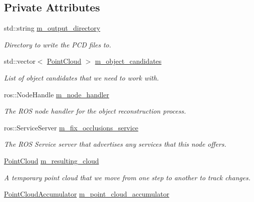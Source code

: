 \subsection*{\-Private \-Attributes}
\begin{DoxyCompactItemize}
\item 
std\-::string \hyperlink{classobject__reconstruction__node_a4177671d10573e28564ba3945bb05cb5}{m\-\_\-output\-\_\-directory}
\begin{DoxyCompactList}\small\item\em \-Directory to write the \-P\-C\-D files to. \end{DoxyCompactList}\item 
std\-::vector$<$ \hyperlink{_helper_functions_8h_abb956d1047f4dd2c956fe3cb0dd0004d}{\-Point\-Cloud} $>$ \hyperlink{classobject__reconstruction__node_a1c2d6c9c999230706a087a87aca78cce}{m\-\_\-object\-\_\-candidates}
\begin{DoxyCompactList}\small\item\em \-List of object candidates that we need to work with. \end{DoxyCompactList}\item 
ros\-::\-Node\-Handle \hyperlink{classobject__reconstruction__node_ac4c5d38f03eefaea752963d27555c222}{m\-\_\-node\-\_\-handler}
\begin{DoxyCompactList}\small\item\em \-The \-R\-O\-S node handler for the object reconstruction process. \end{DoxyCompactList}\item 
ros\-::\-Service\-Server \hyperlink{classobject__reconstruction__node_a0beb4c4e79ee822d4ca5bb320eb8ddfd}{m\-\_\-fix\-\_\-occlusions\-\_\-service}
\begin{DoxyCompactList}\small\item\em \-The \-R\-O\-S \-Service server that advertises any services that this node offers. \end{DoxyCompactList}\item 
\hyperlink{_helper_functions_8h_abb956d1047f4dd2c956fe3cb0dd0004d}{\-Point\-Cloud} \hyperlink{classobject__reconstruction__node_ab8f97cd647f37bc708c8d7542150c17c}{m\-\_\-resulting\-\_\-cloud}
\begin{DoxyCompactList}\small\item\em \-A temporary point cloud that we move from one step to another to track changes. \end{DoxyCompactList}\item 
\hyperlink{class_point_cloud_accumulator}{\-Point\-Cloud\-Accumulator} \hyperlink{classobject__reconstruction__node_aa3895b09cfc1f4e4ace4f7c28515b89d}{m\-\_\-point\-\_\-cloud\-\_\-accumulator}

\end{DoxyCompactItemize}
